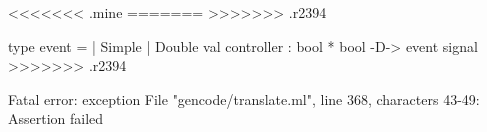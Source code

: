 <<<<<<< .mine
\chklistingfalse
=======
\chklistingtrue
>>>>>>> .r2394
\begin{ChkListingMsg}
type event   =  | Simple  | Double 
val controller : bool * bool -D-> event signal 
>>>>>>> .r2394
\end{ChkListingMsg}
\begin{ChkListingErr}
Fatal error: exception File "gencode/translate.ml", line 368, characters 43-49: Assertion failed
\end{ChkListingErr}
